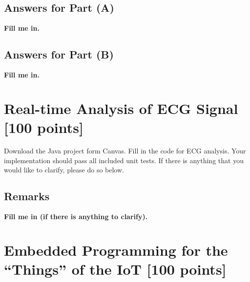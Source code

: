 \documentclass[11pt]{article}
\newcommand{\red}[1]{\textbf{\color{red} #1}}
\begin{document}
\subsection*{Answers for Part (A)}

\red{Fill me in.}

\subsection*{Answers for Part (B)}

\red{Fill me in.}


\section{Real-time Analysis of ECG Signal [100 points]}

Download the Java project form Canvas. Fill in the code for ECG analysis. Your implementation should pass all included unit tests. If there is anything that you would like to clarify, please do so below.

\subsection*{Remarks}

\red{Fill me in (if there is anything to clarify).}


\section{Embedded Programming for the ``Things'' of the IoT [100 points]}
\end{document}
